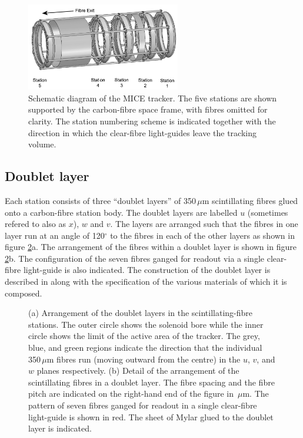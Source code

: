 \begin{figure}
  \includegraphics[width=0.6\textwidth]{detectors/tracker/02-Definitions/Figures/StnNum.pdf}
  \caption{Schematic diagram of the MICE tracker. The five stations are shown supported by the carbon-fibre space frame, with fibres omitted for clarity. The station numbering scheme is indicated together with the direction in which the clear-fibre light-guides leave the tracking volume.}
  \label{Fig:StnNum}
\end{figure}

\subsection{Doublet layer}
\label{SubSect:DblLyr}

Each station consists of three ``doublet layers'' of 350\,$\mu$m scintillating fibres glued onto a carbon-fibre station body. The doublet layers are labelled $u$ (sometimes refered to also as $x$), $w$ and $v$.  The layers are arranged such that the fibres in one layer run at an angle of 120$^\circ$ to the fibres in each of the other layers as shown in figure \ref{Fig:DblLyr}a.   The arrangement of the fibres within a doublet layer is shown in figure \ref{Fig:DblLyr}b.   The configuration of the seven fibres ganged for readout via a single clear-fibre light-guide is also indicated. The construction of the doublet layer is described in \cite{TrackerPaper} along with the specification of the various materials of which it is composed.
\begin{figure}
  \caption{(a) Arrangement of the doublet layers in the scintillating-fibre  stations. The outer circle shows the solenoid bore while the inner circle shows the limit of the active area of the tracker. The grey, blue, and green regions indicate the direction that the individual 350\,$\mu$m fibres run (moving outward from the centre) in the $u$, $v$, and $w$ planes respectively. (b) Detail of the arrangement of the scintillating fibres in a doublet layer. The fibre spacing and the fibre pitch are indicated on the right-hand end of the figure in \,$\mu$m. The pattern of seven fibres ganged for readout in a single clear-fibre light-guide is shown in red. The sheet of Mylar glued to the doublet layer is indicated.}
  \label{Fig:DblLyr}
\end{figure}

